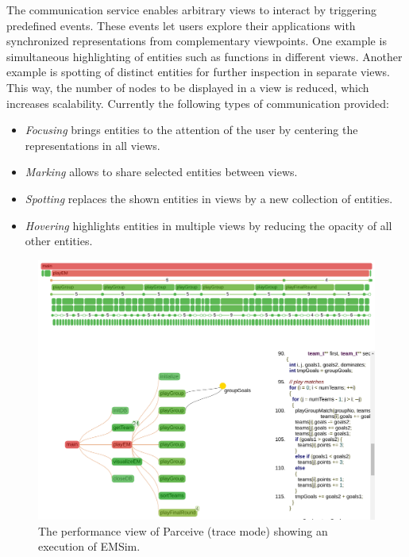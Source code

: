 The communication service enables arbitrary views to interact by triggering
predefined events. These events let users explore their applications with
synchronized representations from complementary viewpoints. One example is
simultaneous highlighting of entities such as functions in different views.
Another example is spotting of distinct entities for further inspection in
separate views. This way, the number of nodes to be displayed in a view is
reduced, which increases scalability. Currently the following types of
communication provided:

\begin{itemize}
	\item \textit{Focusing} brings entities to the attention of the user by
centering the representations in all views.
	\item \textit{Marking} allows to share selected entities between views.
	\item \textit{Spotting} replaces the shown entities in views by a new
collection of entities.
	\item \textit{Hovering} highlights entities in multiple views by reducing the
opacity of all other entities.
\end{itemize}

\begin{figure}[ht!]
	\begin{center}
		\includegraphics[clip, trim=0.1cm 16.0cm 0.1cm 0.1cm,
width=\linewidth]{img/performance_view.pdf}
		\caption{The performance view of Parceive (trace mode) showing an execution
of EMSim.}
		\label{fig:emsim}
	\end{center}
\end{figure}